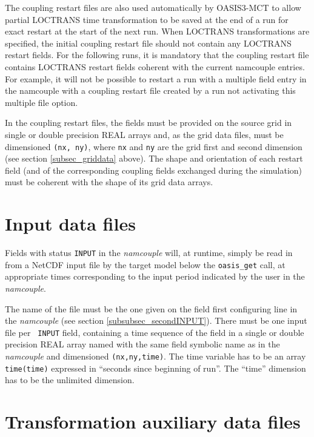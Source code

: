 The coupling restart files are also used automatically by OASIS3-MCT
to allow partial LOCTRANS time transformation to be saved at the end
of a run for exact restart at the start of the next run. When LOCTRANS
transformations are specified, the initial coupling restart file
should not contain any LOCTRANS restart fields. For the following
runs, it is mandatory that the coupling restart file contains LOCTRANS
restart fields coherent with the current namcouple entries. For
example, it will not be possible to restart a run with a multiple
field entry in the namcouple with a coupling restart file created by a 
run not activating this multiple file option.


In the coupling restart files, the fields must be provided on the
source grid in single or double precision REAL arrays and, as the grid
data files, must be dimensioned {\tt (nx, ny)}, where {\tt nx} and
{\tt ny} are the grid first and second dimension (see section
\ref{subsec_griddata} above).  The shape and orientation of each
restart field (and of the corresponding coupling fields exchanged
during the simulation) must be coherent with the shape of its grid
data arrays.

\section{Input data files}
\label{subsec_inputdata}

Fields with status {\tt INPUT} in the {\it namcouple} will, at
runtime, simply be read in from a NetCDF input file by the target
model below the {\tt oasis\_get} call, at appropriate times
corresponding to the input period indicated by the user in the {\it
  namcouple}.

The name of the file must be the one given on the field first
configuring line in the {\it namcouple} (see section
\ref{subsubsec_secondINPUT}). There must be one input file per {\tt
  INPUT} field, containing a time sequence of the field in a single or
double precision REAL array named with the same field symbolic name as in the
{\it namcouple} and dimensioned {\tt (nx,ny,time)}.  The time variable
has to be an array {\tt time(time)} expressed in ``seconds since
beginning of run''. The ``time'' dimension has to be the unlimited
dimension.


\section{Transformation auxiliary data files}
\label{subsec_mapdata}

